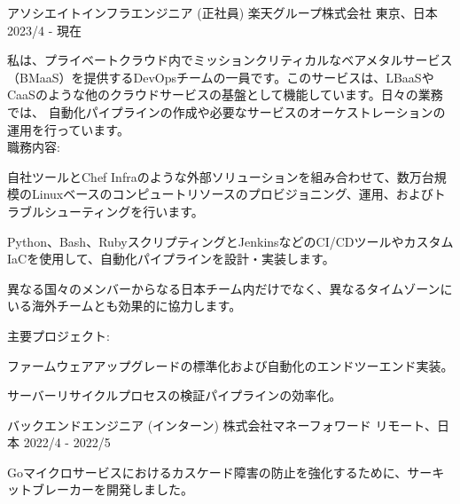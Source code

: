 

\begin{cventries}

  \cventry
    {アソシエイトインフラエンジニア (正社員)} %
    {楽天グループ株式会社} %
    {東京、日本} %
    {2023/4 - 現在} %
    {
      \begin{cvjobdesc} %
        私は、プライベートクラウド内でミッションクリティカルなベアメタルサービス（BMaaS）を提供するDevOpsチームの一員です。このサービスは、LBaaSやCaaSのような他のクラウドサービスの基盤として機能しています。日々の業務では、
        自動化パイプラインの作成や必要なサービスのオーケストレーションの運用を行っています。
        \vspace{2.0mm}
        \\職務内容:
        \begin{cvbullets}
        \item {自社ツールとChef Infraのような外部ソリューションを組み合わせて、数万台規模のLinuxベースのコンピュートリソースのプロビジョニング、運用、およびトラブルシューティングを行います。}
        \item {Python、Bash、RubyスクリプティングとJenkinsなどのCI/CDツールやカスタムIaCを使用して、自動化パイプラインを設計・実装します。}
        \item {異なる国々のメンバーからなる日本チーム内だけでなく、異なるタイムゾーンにいる海外チームとも効果的に協力します。}
        \end{cvbullets}
        \vspace{2.0mm}
        主要プロジェクト:
        \begin{cvbullets}
        \item {ファームウェアアップグレードの標準化および自動化のエンドツーエンド実装。}
        \item {サーバーリサイクルプロセスの検証パイプラインの効率化。}
        \end{cvbullets}
      \end{cvjobdesc}
    }

\cventry
  {バックエンドエンジニア (インターン)} %
  {株式会社マネーフォワード} %
  {リモート、日本} %
  {2022/4 - 2022/5} %
  {
    \begin{cvitems} %
      \item {Goマイクロサービスにおけるカスケード障害の防止を強化するために、サーキットブレーカーを開発しました。}
    \end{cvitems}
  }


\end{cventries}
